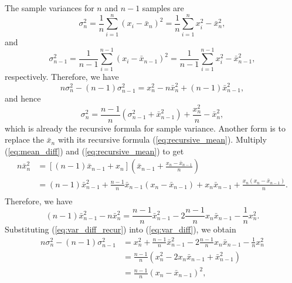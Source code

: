 \documentclass{article}
\begin{document}
The sample variances for $n$ and $n-1$ samples are
\begin{equation}
  \sigma_n^2
  =\frac{1}{n}\sum_{i=1}^n(x_i-\bar{x}_n)^2
  =\frac{1}{n}\sum_{i=1}^nx_i^2-\bar{x}_n^2,
\end{equation}
and
\begin{equation}
  \sigma_{n-1}^2
  =\frac{1}{n-1}\sum_{i=1}^{n-1}(x_i-\bar{x}_{n-1})^2
  =\frac{1}{n-1}\sum_{i=1}^{n-1}x_i^2-\bar{x}_{n-1}^2,
\end{equation}
respectively. Therefore, we have
\begin{equation}
  \label{eq:var_diff}
  n\sigma_n^2-(n-1)\sigma_{n-1}^2
  =x_n^2-n\bar{x}_n^2+(n-1)\bar{x}_{n-1}^2,
\end{equation}
and hence
\begin{equation}
  \sigma_n^2=\frac{n-1}{n}(\sigma_{n-1}^2+\bar{x}_{n-1}^2)+\frac{x_n^2}{n}-\bar{x}_n^2,
\end{equation}
which is already the recursive formula for sample variance. Another form is to replace the $\bar{x}_n$ with its recursive formula (\ref{eq:recursive_mean}). Multiply (\ref{eq:mean_diff}) and (\ref{eq:recursive_mean}) to get
\begin{equation}
  \begin{aligned}
    n\bar{x}_n^2
    &=[(n-1)\bar{x}_{n-1}+x_n]\left(\bar{x}_{n-1}+\frac{x_n-\bar{x}_{n-1}}{n}\right)\\
    &=(n-1)\bar{x}_{n-1}^2+\frac{n-1}{n}\bar{x}_{n-1}(x_n-\bar{x}_{n-1})+x_n\bar{x}_{n-1}+\frac{x_n(x_n-\bar{x}_{n-1})}{n}.\\
  \end{aligned}
\end{equation}
Therefore, we have
\begin{equation}
  \label{eq:var_diff_recur}
  (n-1)\bar{x}_{n-1}^2-n\bar{x}_n^2
  =\frac{n-1}{n}\bar{x}_{n-1}^2-2\frac{n-1}{n}x_n\bar{x}_{n-1}-\frac{1}{n}x_n^2.
\end{equation}
Substituting (\ref{eq:var_diff_recur}) into (\ref{eq:var_diff}), we obtain
\begin{equation}
  \begin{aligned}
    n\sigma_n^2-(n-1)\sigma_{n-1}^2
    &=x_n^2+\frac{n-1}{n}\bar{x}_{n-1}^2-2\frac{n-1}{n}x_n\bar{x}_{n-1}-\frac{1}{n}x_n^2\\
    &=\frac{n-1}{n}(x_n^2-2x_n\bar{x}_{n-1}+\bar{x}_{n-1}^2)\\
    &=\frac{n-1}{n}(x_n-\bar{x}_{n-1})^2,
  \end{aligned}
\end{equation}
\end{document}
